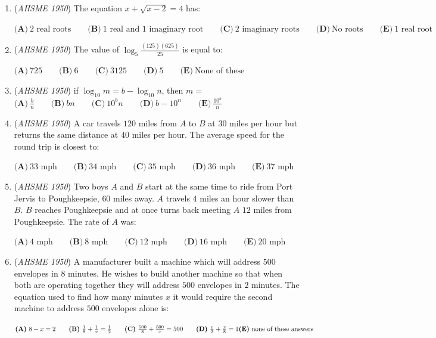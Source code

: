 \begin{enumerate}
	\item (\textit{AHSME 1950}) The equation $x+\sqrt{x-2}=4$ has:


 $\textbf{(A)}\ \text{2 real roots}\qquad\textbf{(B)}\ \text{1 real and 1 imaginary root}\qquad\textbf{(C)}\ \text{2 imaginary roots}\qquad\textbf{(D)}\ \text{No roots}\qquad\textbf{(E)}\ \text{1 real root}$


	\item (\textit{AHSME 1950}) The value of $\log_{5}\frac{(125)(625)}{25}$ is equal to:


 $\textbf{(A)}\ 725\qquad\textbf{(B)}\ 6\qquad\textbf{(C)}\ 3125\qquad\textbf{(D)}\ 5\qquad\textbf{(E)}\ \text{None of these}$


	\item (\textit{AHSME 1950}) if $\log_{10}{m}= b-\log_{10}{n}$, then $m=$
$\textbf{(A)}\ \frac{b}{n}\qquad\textbf{(B)}\ bn\qquad\textbf{(C)}\ 10^{b}n\qquad\textbf{(D)}\ b-10^{n}\qquad\textbf{(E)}\ \frac{10^{b}}{n}$


	\item (\textit{AHSME 1950}) A car travels $120$ miles from $A$ to $B$ at $30$ miles per hour but returns the same distance at $40$ miles per hour. The average speed for the round trip is closest to:


 $\textbf{(A)}\ 33\text{ mph}\qquad\textbf{(B)}\ 34\text{ mph}\qquad\textbf{(C)}\ 35\text{ mph}\qquad\textbf{(D)}\ 36\text{ mph}\qquad\textbf{(E)}\ 37\text{ mph}$


	\item (\textit{AHSME 1950}) Two boys $A$ and $B$ start at the same time to ride from Port Jervis to Poughkeepsie, $60$ miles away. $A$ travels $4$ miles an hour slower than $B$.  $B$ reaches Poughkeepsie and at once turns back meeting $A$ $12$ miles from Poughkeepsie. The rate of $A$ was:


 $\textbf{(A)}\ 4\text{ mph}\qquad\textbf{(B)}\ 8\text{ mph}\qquad\textbf{(C)}\ 12\text{ mph}\qquad\textbf{(D)}\ 16\text{ mph}\qquad\textbf{(E)}\ 20\text{ mph}$


	\item (\textit{AHSME 1950}) A manufacturer built a machine which will address $500$ envelopes in $8$ minutes. He wishes to build another machine so that when both are operating together they will address $500$ envelopes in $2$ minutes. The equation used to find how many minutes $x$ it would require the second machine to address $500$ envelopes alone is:


 $\textbf{(A)}\ 8-x=2\qquad\textbf{(B)}\ \frac{1}{8}+\frac{1}{x}=\frac{1}{2}\qquad\textbf{(C)}\ \frac{500}{8}+\frac{500}{x}=500\qquad\textbf{(D)}\ \frac{x}{2}+\frac{x}{8}=1\qquad\\ \textbf{(E)}\ \text{none of these answers}$



\end{enumerate}
